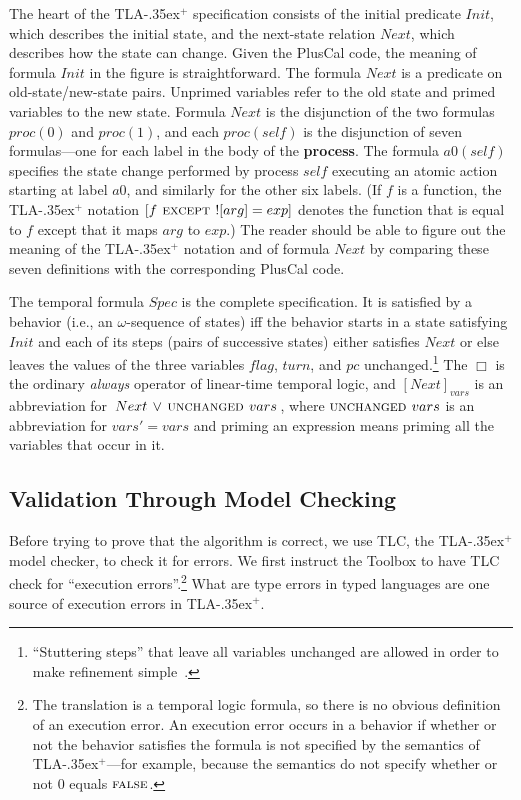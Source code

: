 \documentclass[a4paper]{llncs}
\newcommand{\tlaplus}{\mbox{TLA\kern -.35ex$^+$}\xspace}
\begin{document}
The heart of the \tlaplus specification consists of the initial predicate
$Init$, which describes the initial state, and the next-state relation $Next$,
which describes how the state can change. 
Given the PlusCal code, the meaning of formula $Init$ in the figure is
straightforward.  The formula $Next$ is a predicate on
old-state/new-state pairs.  Unprimed variables refer to the old state
and primed variables to the new state.  Formula $Next$ is the
disjunction of the two formulas $proc(0)$ and $proc(1)$, and each
$proc(self)$ is the disjunction of seven formulas---one for each label
in the body of the \textbf{process}.  The formula $a0(self)$ specifies
the state change performed by process $self$ executing an atomic
action starting at label $a0$, and similarly for the other six labels.
(If $f$ is a function, the \tlaplus notation $[f \textsc{ except } ![arg] = exp]$ denotes
the function that is equal to $f$ except that it maps $arg$ to $exp$.)
The reader should be able to figure out the meaning of the \tlaplus
notation and of formula $Next$ by comparing these seven definitions
with the corresponding PlusCal code.

The temporal formula $Spec$ is the complete specification.  It is
satisfied by a behavior (i.e., an $\omega$-sequence of states) 
iff the behavior starts in a state satisfying
$Init$ and each of its steps (pairs of successive states) either
satisfies $Next$ or else leaves the values of the three variables
$flag$, $turn$, and $pc$ unchanged.\footnote{``Stuttering steps'' that
  leave all variables unchanged are allowed in order to make refinement
  simple~\cite{lamport:what-good}.} The $\Box$ is the ordinary
\emph{always} operator of linear-time temporal logic, and
$[Next]_{vars}$ is an abbreviation for \,\mbox{$Next \,\lor\,
\textsc{unchanged } vars$}\,, where $\textsc{unchanged } vars$ is an abbreviation for
$vars'=vars$ and priming an expression means priming all the variables
that occur in it.


\subsection{Validation Through Model Checking}
\label{sec:model-checking}

Before trying to prove that the algorithm is correct, we use TLC,
the \tlaplus model checker, to check it for errors.
We first instruct the Toolbox to have TLC check for
``execution errors''.\footnote{The translation is a
  temporal logic formula, so there is no obvious definition of an
   execution error.  An execution error occurs in a
  behavior if whether or not the behavior satisfies the formula is not
  specified by the semantics of \tlaplus---for example, because
  the semantics do not specify whether or not 0 equals $\textsc{false}$.}
What are type errors in typed languages are one source of execution
errors in \tlaplus.
\end{document}
